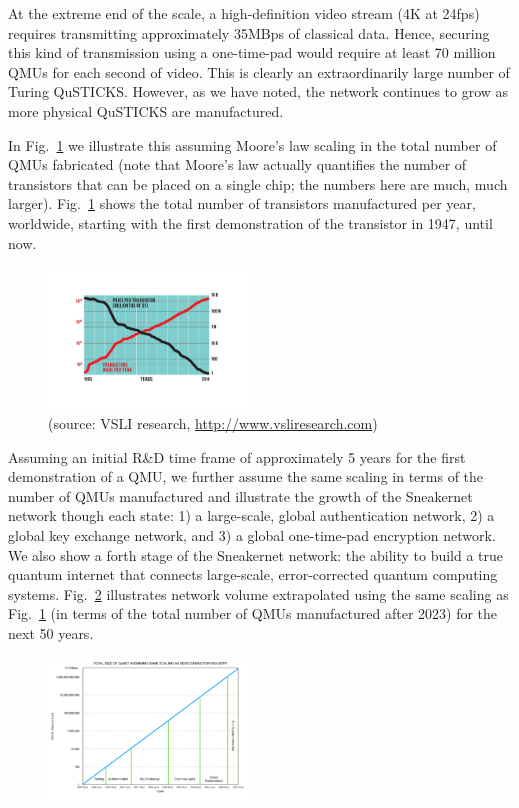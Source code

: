 \documentclass[twocolumn, aps, rmp, amsmath, amssymb, nofootinbib, superscriptaddress, longbibliography, floatfix, table-of-contents, eqsecnum]{revtex4-2}
\begin{document}
At the extreme end of the scale, a high-definition video stream (4K at 24fps) requires transmitting approximately 35MBps of classical data. Hence, securing this kind of transmission using a one-time-pad would require at least 70 million QMUs for each second of video. This is clearly an extraordinarily large number of Turing QuSTICKS. However, as we have noted, the network continues to grow as more physical QuSTICKS are manufactured. 

In Fig.~\ref{fig:transistor} we illustrate this assuming Moore's law scaling in the total number of QMUs fabricated (note that Moore's law actually quantifies the number of transistors that can be placed on a single chip; the numbers here are much, much larger). Fig.~\ref{fig:transistor} shows the total number of transistors manufactured per year, worldwide, starting with the first demonstration of the transistor in 1947, until now. 

\begin{figure}[htbp!]
	\includegraphics[clip=true, width=0.475\textwidth]{transistor}
	\caption{(source: VSLI research, \href{http://www.vsliresearch.com}{http://www.vsliresearch.com})} \label{fig:transistor}
\end{figure}

Assuming an initial R\&D time frame of approximately 5 years for the first demonstration of a QMU, we further assume the same scaling in terms of the number of QMUs manufactured and illustrate the growth of the Sneakernet network though each state: 1) a large-scale, global authentication network, 2) a global key exchange network, and 3) a global one-time-pad encryption network. We also show a forth stage of the Sneakernet network: the ability to build a true quantum internet that connects large-scale, error-corrected quantum computing systems. Fig.~\ref{fig:QMU} illustrates network volume extrapolated using the same scaling as Fig.~\ref{fig:transistor} (in terms of the total number of QMUs manufactured after 2023) for the next 50 years. 

\begin{figure}[htbp!]
	\includegraphics[clip=true, width=0.475\textwidth]{QMU}
	\caption{} \label{fig:QMU}
\end{figure}
\end{document}
